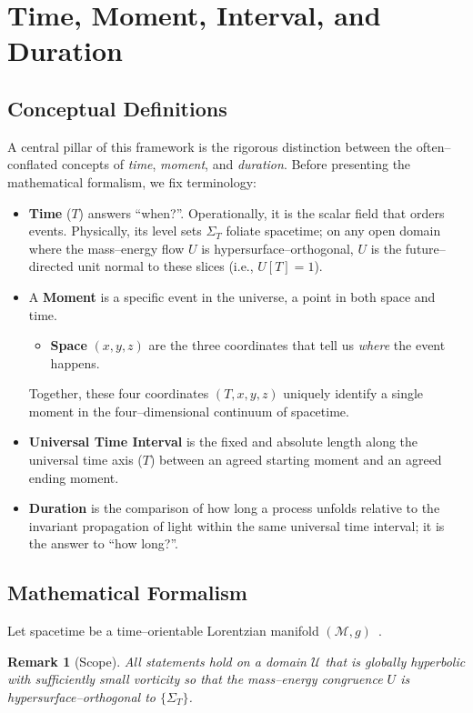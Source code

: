 \documentclass[12pt]{article}
\theoremstyle{plain}
\newtheorem{remark}{Remark}
\begin{document}
\section{Time, Moment, Interval, and Duration}
\label{sec:time-moment-duration}
\subsection{Conceptual Definitions}

A central pillar of this framework is the rigorous distinction between the often–conflated concepts of \emph{time}, \emph{moment}, and \emph{duration}. Before presenting the mathematical formalism, we fix terminology:

\begin{itemize}
  \item \textbf{Time} ($T$) answers ``when?''. Operationally, it is the scalar field that orders events. Physically, its level sets $\Sigma_T$ foliate spacetime; on any open domain where the mass–energy flow $U$ is hypersurface–orthogonal, $U$ is the future–directed unit normal to these slices (i.e., $U[T]=1$).
  \item A \textbf{Moment} is a specific event in the universe, a point in both space and time.
    \begin{itemize}
      \item \textbf{Space} $(x,y,z)$ are the three coordinates that tell us \emph{where} the event happens.
    \end{itemize}
    Together, these four coordinates $(T,x,y,z)$ uniquely identify a single moment in the four–dimensional continuum of spacetime.
  \item \textbf{Universal Time Interval} is the fixed and absolute length along the universal time axis ($T$) between an agreed starting moment and an agreed ending moment.
  \item \textbf{Duration} is the comparison of how long a process unfolds relative to the invariant propagation of light within the same universal time interval; it is the answer to ``how long?''.
\end{itemize}

\subsection{Mathematical Formalism}

Let spacetime be a time–orientable Lorentzian manifold $(\mathcal{M}, g)$~\cite{Carroll2004}.

\begin{remark}[Scope]
All statements hold on a domain $\mathcal{U}$ that is globally hyperbolic with sufficiently small vorticity so that the mass–energy congruence $U$ is hypersurface–orthogonal to $\{\Sigma_T\}$.
\end{remark}
\end{document}
